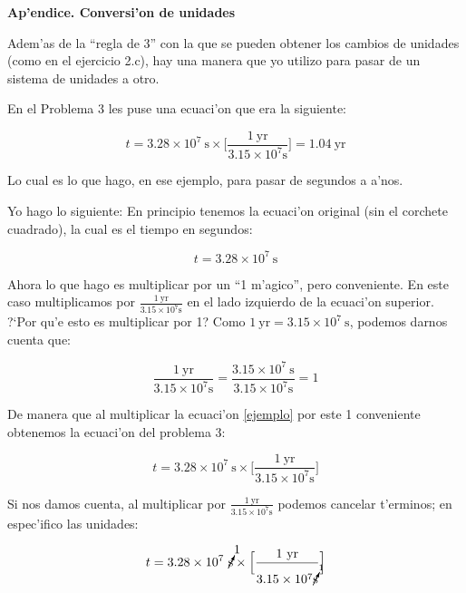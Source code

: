 \documentclass{article}
\begin{document}
\newpage

\textbf{Ap'endice. Conversi'on de unidades}

\vspace{2mm}

Adem'as de la ``regla de 3'' con la que se pueden obtener los cambios de unidades (como en el ejercicio 2.c), hay una manera que yo utilizo para pasar de un sistema de unidades a otro.

En el Problema 3 les puse una ecuaci'on que era la siguiente:

\begin{equation*}
t = 3.28 \times 10^7 \ \text{s} \times \Big[ \frac{1 \ \text{yr}}{3.15 \times 10^7 \text{s}} \Big] = 1.04 \ \text{yr}
\end{equation*}

Lo cual es lo que hago, en ese ejemplo, para pasar de segundos a a'nos.

Yo hago lo siguiente: En principio tenemos la ecuaci'on original (sin el corchete cuadrado), la cual es el tiempo en segundos:

\begin{equation} \label{ejemplo}
t = 3.28 \times 10^7 \ \text{s}
\end{equation}

Ahora lo que hago es multiplicar por un ``1 m'agico'', pero conveniente. En este caso multiplicamos por $\frac{1 \ \text{yr}}{3.15 \times 10^7 \text{s}}$ en el lado izquierdo de la ecuaci'on superior. ?`Por qu'e esto es multiplicar por 1? Como $1 \ \text{yr} = 3.15 \times 10^{7} \ \text{s}$, podemos darnos cuenta que:

\begin{equation*}
\frac{1 \ \text{yr}}{3.15 \times 10^7 \text{s}} = \frac{3.15 \times 10^{7} \ \text{s}}{3.15 \times 10^7 \text{s}} = 1
\end{equation*}

De manera que al multiplicar la ecuaci'on \eqref{ejemplo} por este 1 conveniente obtenemos la ecuaci'on del problema 3:

\begin{equation*}
t = 3.28 \times 10^7 \ \text{s} \times \Big[ \frac{1 \ \text{yr}}{3.15 \times 10^7 \text{s}} \Big]
\end{equation*}

Si nos damos cuenta, al multiplicar por $\frac{1 \ \text{yr}}{3.15 \times 10^7 \text{s}}$ podemos cancelar t'erminos; en espec'ifico las unidades:

\begin{equation}
t = 3.28 \times 10^7 \ \cancelto{1}{\text{s}} \times \Big[ \frac{1 \ \text{yr}}{3.15 \times 10^7 \cancelto{1}{\text{s}}} \Big]
\end{equation}
\end{document}
